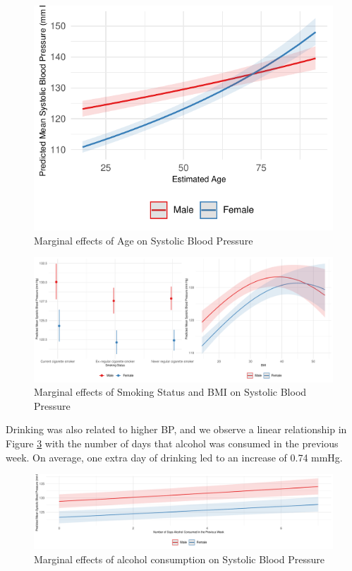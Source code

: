 \documentclass[
  11pt,
  twocolumn]{article}
\begin{document}
\begin{figure}[H]
\includegraphics{Coursework_files/figure-latex/output-effect-plots-age-1} \caption{Marginal effects of Age on Systolic Blood Pressure}\label{fig:output-effect-plots-age}
\end{figure}
\begin{figure}[H]
\includegraphics{Coursework_files/figure-latex/output-effect-plots-1} \caption{Marginal effects of Smoking Status and BMI on Systolic Blood Pressure}\label{fig:output-effect-plots}
\end{figure}

Drinking was also related to higher BP, and we observe a linear
relationship in Figure \ref{fig:output-effect-plots-alc} with the number
of days that alcohol was consumed in the previous week. On average, one
extra day of drinking led to an increase of 0.74 mmHg.

\begin{figure}[H]
\includegraphics{Coursework_files/figure-latex/output-effect-plots-alc-1} \caption{Marginal effects of alcohol consumption on Systolic Blood Pressure}\label{fig:output-effect-plots-alc}
\end{figure}
\end{document}
